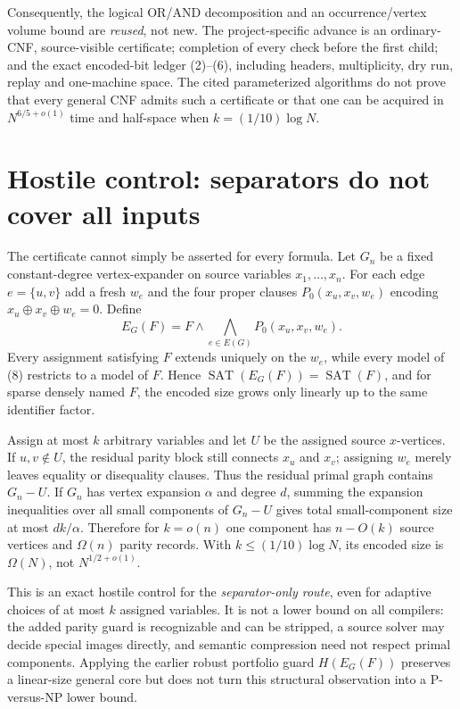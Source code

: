 \documentclass[11pt]{article}
\newcommand{\SAT}{\operatorname{SAT}}
\begin{document}
Consequently, the logical OR/AND decomposition and an occurrence/vertex
volume bound are \emph{reused}, not new.  The project-specific advance is an
ordinary-CNF, source-visible certificate; completion of every check before
the first child; and the exact encoded-bit ledger (2)--(6), including headers,
multiplicity, dry run, replay and one-machine space.  The cited parameterized
algorithms do not prove that every general CNF admits such a certificate or
that one can be acquired in $N^{6/5+o(1)}$ time and half-space when
$k=(1/10)\log N$.

\section{Hostile control: separators do not cover all inputs}
The certificate cannot simply be asserted for every formula.  Let $G_n$ be a
fixed constant-degree vertex-expander on source variables
$x_1,\ldots,x_n$.  For each edge $e=\{u,v\}$ add a fresh $w_e$ and the four
proper clauses $P_0(x_u,x_v,w_e)$ encoding
$x_u\oplus x_v\oplus w_e=0$.  Define
\[
 E_G(F)=F\wedge\bigwedge_{e\in E(G)}P_0(x_u,x_v,w_e).       \tag{8}
\]
Every assignment satisfying $F$ extends uniquely on the $w_e$, while every
model of (8) restricts to a model of $F$.  Hence $\SAT(E_G(F))=\SAT(F)$, and
for sparse densely named $F$, the encoded size grows only linearly up to the
same identifier factor.

Assign at most $k$ arbitrary variables and let $U$ be the assigned source
$x$-vertices.  If $u,v\notin U$, the residual parity block still connects
$x_u$ and $x_v$; assigning $w_e$ merely leaves equality or disequality
clauses.  Thus the residual primal graph contains $G_n-U$.  If $G_n$ has
vertex expansion $\alpha$ and degree $d$, summing the expansion inequalities
over all small components of $G_n-U$ gives total small-component size at most
$dk/\alpha$.  Therefore for $k=o(n)$ one component has $n-O(k)$ source
vertices and $\Omega(n)$ parity records.  With $k\le(1/10)\log N$, its
encoded size is $\Omega(N)$, not $N^{1/2+o(1)}$.

This is an exact hostile control for the \emph{separator-only route}, even
for adaptive choices of at most $k$ assigned variables.  It is not a lower
bound on all compilers: the added parity guard is recognizable and can be
stripped, a source solver may decide special images directly, and semantic
compression need not respect primal components.  Applying the earlier robust
portfolio guard $H(E_G(F))$ preserves a linear-size general core but does not
turn this structural observation into a P-versus-NP lower bound.
\end{document}
